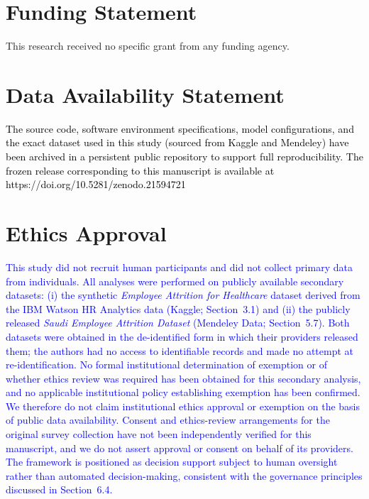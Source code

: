 \documentclass[a4paper,fleqn]{cas-sc}
\begin{document}
\section*{Funding Statement}
This research received no specific grant from any funding agency.

\section*{Data Availability Statement}
\textcolor{black}{The source code, software environment specifications, model configurations, and the exact dataset used in this study (sourced from Kaggle and Mendeley) have been archived in a persistent public repository to support full reproducibility. The frozen release corresponding to this manuscript is available at https://doi.org/10.5281/zenodo.21594721}
\section*{Ethics Approval}
\textcolor{blue}{This study did not recruit human participants and did not collect primary data from individuals. All analyses were performed on publicly available secondary datasets: (i) the synthetic \emph{Employee Attrition for Healthcare} dataset derived from the IBM Watson HR Analytics data (Kaggle; Section~3.1) and (ii) the publicly released \emph{Saudi Employee Attrition Dataset} (Mendeley Data; Section~5.7). Both datasets were obtained in the de-identified form in which their providers released them; the authors had no access to identifiable records and made no attempt at re-identification. No formal institutional determination of exemption or of whether ethics review was required has been obtained for this secondary analysis, and no applicable institutional policy establishing exemption has been confirmed. We therefore do not claim institutional ethics approval or exemption on the basis of public data availability. Consent and ethics-review arrangements for the original survey collection have not been independently verified for this manuscript, and we do not assert approval or consent on behalf of its providers. The framework is positioned as decision support subject to human oversight rather than automated decision-making, consistent with the governance principles discussed in Section~6.4.}

\printcredits


% 
\end{document}
